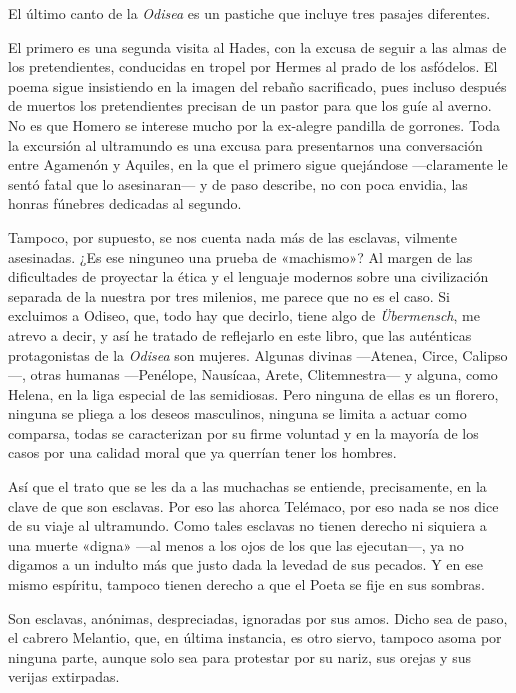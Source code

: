 \label{cap:laertes}

El último canto de la \emph{Odisea} es un pastiche que incluye tres pasajes diferentes.

El primero es una segunda visita al Hades, con la excusa de seguir a las almas de los pretendientes, conducidas en tropel por Hermes al prado de los asfódelos. El poema sigue insistiendo en la imagen del rebaño sacrificado, pues incluso después de muertos los pretendientes precisan de un pastor para que los guíe al averno. No es que Homero se interese mucho por la ex-alegre pandilla de gorrones. Toda la excursión al ultramundo es una excusa para presentarnos una conversación entre Agamenón y Aquiles, en la que el primero sigue quejándose ---claramente le sentó fatal que lo asesinaran--- y de paso describe, no con poca envidia, las honras fúnebres dedicadas al segundo.

Tampoco, por supuesto, se nos cuenta nada más de las esclavas, vilmente asesinadas. ¿Es ese ninguneo una prueba de «machismo»? Al margen de las dificultades de proyectar la ética y el lenguaje modernos sobre una civilización separada de la nuestra por tres milenios, me parece que no es el caso. Si excluimos a Odiseo, que, todo hay que decirlo, tiene algo de \emph{Übermensch}, me atrevo a decir, y así he tratado de reflejarlo en este libro, que las auténticas protagonistas de la \emph{Odisea} son mujeres. Algunas divinas ---Atenea, Circe, Calipso---, otras humanas ---Penélope, Nausícaa, Arete, Clitemnestra--- y alguna, como Helena, en la liga especial de las semidiosas. Pero ninguna de ellas es un florero, ninguna se pliega a los deseos masculinos, ninguna se limita a actuar como comparsa, todas se caracterizan por su firme voluntad y en la mayoría de los casos por una calidad moral que ya querrían tener los hombres.

Así que el trato que se les da a las muchachas se entiende, precisamente, en la clave de que son esclavas. Por eso las ahorca Telémaco, por eso nada se nos dice de su viaje al ultramundo. Como tales esclavas no tienen derecho ni siquiera a una muerte «digna» ---al menos a los ojos de los que las ejecutan---, ya no digamos a un indulto más que justo dada la levedad de sus pecados. Y en ese mismo espíritu, tampoco tienen derecho a que el Poeta se fije en sus sombras.

Son esclavas, anónimas, despreciadas, ignoradas por sus amos. Dicho sea de paso, el cabrero Melantio, que, en última instancia, es otro siervo, tampoco asoma por ninguna parte, aunque solo sea para protestar por su nariz, sus orejas y sus verijas extirpadas.


